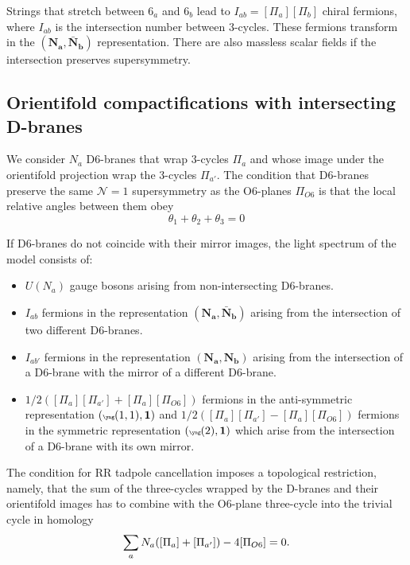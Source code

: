 Strings that stretch between $6_a$ and $6_b$ lead to $I_{ab}=[\Pi_a][\Pi_b]$ chiral fermions, where $I_{ab}$ 
is the intersection number between $3$-cycles. These fermions transform in the $(\mathbf{N_a},\mathbf{\bar N_b})$ representation.
There are also massless scalar fields if the intersection preserves supersymmetry.

\subsection{Orientifold compactifications with intersecting D-branes}

We consider $N_a$ D$6$-branes that wrap 3-cycles $\Pi_a$ and whose image under the orientifold
projection wrap the 3-cycles $\Pi_{a'}$.
The condition that D$6$-branes preserve the same $\mathcal N=1$ supersymmetry as the O$6$-planes $\Pi_{O6}$
is that the local relative angles between them obey
\begin{equation}
  \theta_1 + \theta_2 + \theta_3 = 0
\end{equation}

If D$6$-branes do not coincide with their mirror images, the light spectrum of the model consists of:
\begin{itemize}
  \item $U(N_a)$ gauge bosons arising from non-intersecting D$6$-branes.
  \item $I_{ab}$ fermions in the representation $(\mathbf{N_a},\mathbf{\bar N_b})$ arising from the
    intersection of two different D$6$-branes.
  \item $I_{ab'}$ fermions in the representation $(\mathbf{N_a},\mathbf{N_b})$ arising from the intersection of 
    a D$6$-brane with the mirror of a different D$6$-brane.
  \item $1/2([\Pi_a][\Pi_{a'}]+[\Pi_a][\Pi_{O6}])$ fermions in the anti-symmetric representation $({\tiny\yng(1,1)},\mathbf 1)$ and
    $1/2([\Pi_a][\Pi_{a'}]-[\Pi_a][\Pi_{O6}])$ fermions in the symmetric representation $({\tiny\yng(2)},\mathbf 1)$ which
    arise from the intersection of a D$6$-brane with its own mirror.
\end{itemize}

The condition for RR tadpole cancellation imposes a topological restriction, namely, 
that the sum of the three-cycles wrapped by the D-branes and their orientifold images
has to combine with the O$6$-plane three-cycle into the trivial cycle in homology
\begin{equation}
  \sum_a N_a \qty([\Pi_a] + [\Pi_{a'}]) - 4 [\Pi_{O6}]=0.
\end{equation}


